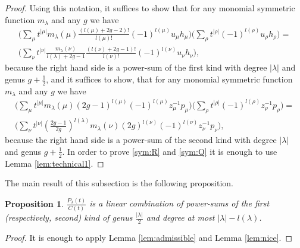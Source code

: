 \documentclass[12pt]{amsart}
\theoremstyle{plain}
\newtheorem{proposition}[lemma]{Proposition}
\theoremstyle{remark}
\begin{document}
\begin{proof}

Using this notation, it suffices to show
that
for any monomial symmetric function $m_{\lambda}$ and any $g$ we have
\begin{multline}
\label{sym:R}
\bigg(\sum_{\mu} t^{|\mu|} m_{\lambda}(\mu) \frac{(l(\mu) + 2g -
2)!}{l(\mu)!} (-1)^{l(\mu)} u_{\mu} h_{\mu} \bigg) \bigg(\sum_{\rho} t^{|\rho|}
(-1)^{l(\rho)} u_{\rho} h_{\rho} \bigg) = \\
\bigg(\sum_{\nu} t^{|\nu|} \frac{m_{\lambda}(\nu)}{l(\lambda) + 2g -1}
\frac{(l(\nu) + 2g -
1)!}{l(\nu)!} (-1)^{l(\nu)} u_{\nu} h_{\nu} \bigg),
\end{multline}
because the right hand side is a power-sum of the
first kind with degree $|\lambda|$ and genus $g+\frac{1}{2}$, and it
suffices to show, that
for any monomial symmetric function $m_{\lambda}$ and any $g$ we have
\begin{multline}
\label{sym:Q}
\bigg(\sum_{\mu} t^{|\mu|} m_{\lambda}(\mu) (2g - 1)^{l(\mu)}
(-1)^{l(\mu)} z^{-1}_{\mu} p_{\mu} \bigg) \bigg(\sum_{\rho} t^{|\rho|}
(-1)^{l(\rho)} z^{-1}_{\rho} p_{\rho} \bigg) = \\
\bigg(\sum_{\nu} t^{|\nu|} \left(\frac{2g - 1}{2g}\right)^{l(\lambda)}
m_{\lambda}(\nu) (2g)^{l(\nu)} (-1)^{l(\nu)} z^{-1}_{\nu}
p_{\nu} \bigg),
\end{multline}
because the right hand side is a power-sum of the
second kind with degree $|\lambda|$ and genus $g+\frac{1}{2}$.
In order to prove \eqref{sym:R} and \eqref{sym:Q} it is enough to use Lemma \ref{lem:technical1}.
\end{proof}




The main result of this subsection is the following proposition.
\begin{proposition}
\label{prop:it-is-nice}
 $\frac{P_{\lambda}(t)}{C(t)}$ is a linear combination of power-sums of the
first (respectively, second) kind of genus
$\frac{|\lambda|}{2}$ and degree at most $|\lambda|-l(\lambda)$.
\end{proposition}
\begin{proof}
It is enough to apply Lemma \ref{lem:admissible} and Lemma \ref{lem:nice}.
\end{proof}
\end{document}
